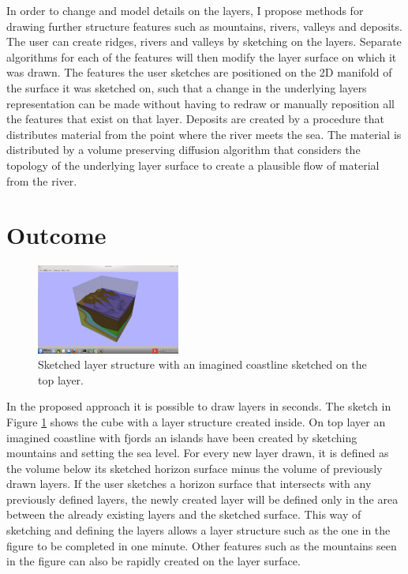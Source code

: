 \documentclass[a4paper,12pt]{report}
\begin{document}
In order to change and model details on the layers, I propose methods for drawing further structure features such as mountains, rivers, valleys and deposits. The user can create ridges, rivers and valleys by sketching on the layers. Separate algorithms for each of the features will then modify the layer surface on which it was drawn. The features the user sketches are positioned on the 2D manifold of the surface it was sketched on, such that a change in the underlying layers representation can be made without having to redraw or manually reposition all the features that exist on that layer. Deposits are created by a procedure that distributes material from the point where the river meets the sea. The material is distributed by a volume preserving diffusion algorithm that considers the topology of the underlying layer surface to create a plausible flow of material from the river.

\section{Outcome}
\begin{figure}

  \begin{center}
    \includegraphics[trim = 80mm 20mm 80mm 25mm, clip,width=0.42\textwidth]{thesis/introSketch.png}
  \end{center}
 
  \caption{Sketched layer structure with an imagined coastline sketched on the top layer.}
  \vspace{15pt}
  \label{fig:introSketch}
  
\end{figure}
In the proposed approach it is possible to draw layers in seconds.  The sketch in Figure \ref{fig:introSketch} shows the cube with a layer structure created inside.  On top layer an imagined coastline with fjords an islands have been created by sketching mountains and setting the sea level. For every new layer drawn, it is defined as the volume below its sketched horizon surface minus the volume of previously drawn layers. If the user sketches a horizon surface that intersects with any previously defined layers, the newly created layer will be defined only in the area between the already existing layers and the sketched surface. This way of sketching and defining the layers allows a layer structure such as the one in the figure to be completed in one minute. Other features such as the mountains seen in the figure can also be rapidly  created on the layer surface.
\end{document}
